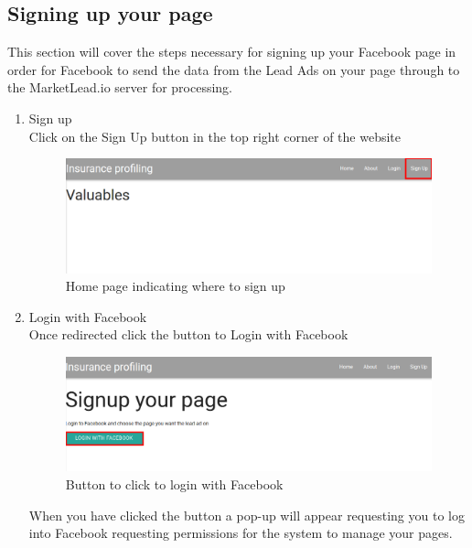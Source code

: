 \documentclass{article}
\begin{document}
		\subsection{Signing up your page}
			This section will cover the steps necessary for signing up your Facebook page in order for Facebook to send the data from the Lead Ads on your page through to the MarketLead.io server for processing.
			\begin{enumerate}
				\item Sign up\\
				Click on the Sign Up button in the top right corner of the website\\
				\begin{figure}[H]
				  \centering
				      \includegraphics[width=\textwidth]{images/home_signup.png}
				  \caption{Home page indicating where to sign up}
				  \label{fig:homeSignup}
				\end{figure}

				\item Login with Facebook\\
				Once redirected click the button to Login with Facebook\\
				\begin{figure}[H]
				  \centering
				      \includegraphics[width=\textwidth]{images/signup_login.png}
				  \caption{Button to click to login with Facebook}
				  \label{fig:signupLogin}
				\end{figure}
				When you have clicked the button a pop-up will appear requesting you to log into Facebook requesting permissions for the system to manage your pages.


\end{enumerate}
\end{document}
